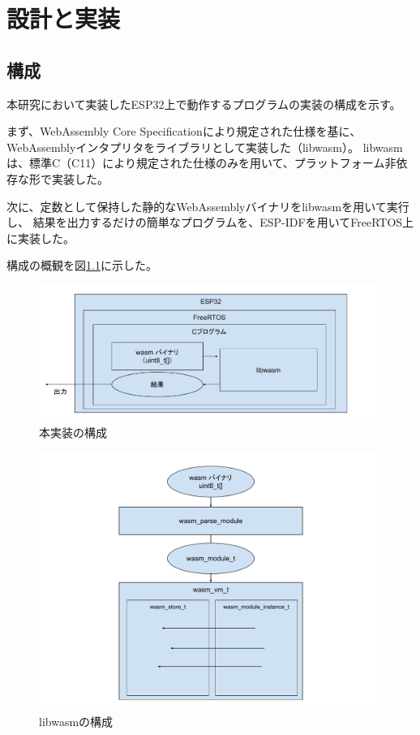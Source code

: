 \chapter{設計と実装}
\label{chap:implementation}

\section{構成}

本研究において実装したESP32上で動作するプログラムの実装の構成を示す。

まず、WebAssembly Core Specification\cite{wasm_spec}により規定された仕様を基に、
WebAssemblyインタプリタをライブラリとして実装した（libwasm）。
libwasmは、標準C（C11）により規定された仕様のみを用いて、プラットフォーム非依存な形で実装した。

次に、定数として保持した静的なWebAssemblyバイナリをlibwasmを用いて実行し、
結果を出力するだけの簡単なプログラムを、ESP-IDF\cite{esp_idf}を用いてFreeRTOS上に実装した。

構成の概観を図\ref{fig:esp32_libwasm}に示した。

\begin{figure}[htbp]
  \caption{本実装の構成}
  \label{fig:esp32_libwasm}
  \begin{center}
    \includegraphics[bb=0 0 800 300,width=12cm]{img/esp32_libwasm.pdf}
  \end{center}
\end{figure}

\begin{figure}[htbp]
  \caption{libwasmの構成}
  \label{fig:libwasm_arch}
  \begin{center}
    \includegraphics[bb=0 0 800 600,width=12cm]{img/libwasm_arch.pdf}
  \end{center}
\end{figure}
